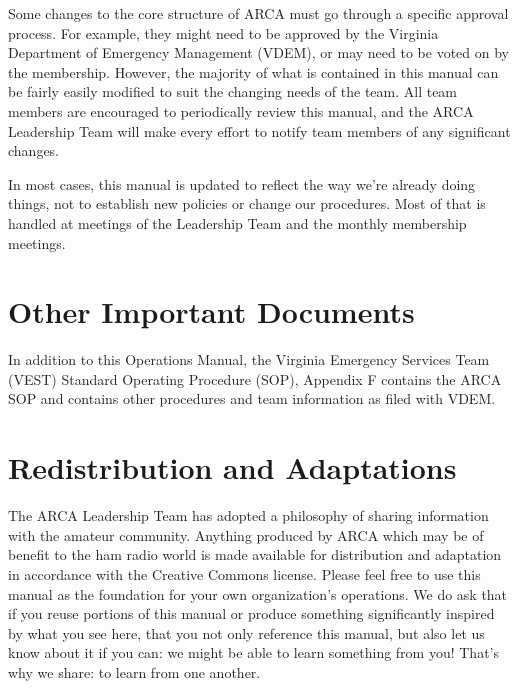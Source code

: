 \documentclass[pdflatex,letterpaper,twoside,12pt]{book}
\begin{document}
Some changes to the core structure of ARCA must go through a specific approval process.  For example, they might need to be approved by the Virginia Department of Emergency Management (VDEM), or may need to be voted on by the membership.  However, the majority of what is contained in this manual can be fairly easily modified to suit the changing needs of the team.  All team members are encouraged to periodically review this manual, and the ARCA Leadership Team will make every effort to notify team members of any significant changes.

In most cases, this manual is updated to reflect the way we're already doing things, not to establish new policies or change our procedures.  Most of that is handled at meetings of the Leadership Team and the monthly membership meetings.


\section{Other Important Documents}

In addition to this Operations Manual, the Virginia Emergency Services Team (VEST) Standard Operating Procedure (SOP), Appendix F contains the ARCA SOP and contains other procedures and team information as filed with VDEM.



\section{Redistribution and Adaptations}

The ARCA Leadership Team has adopted a philosophy of sharing information with the amateur community.  Anything produced by ARCA which may be of benefit to the ham radio world is made available for distribution and adaptation in accordance with the Creative Commons license.  Please feel free to use this manual as the foundation for your own organization's operations.  We do ask that if you reuse portions of this manual or produce something significantly inspired by what you see here, that you not only reference this manual, but also let us know about it if you can:  we might be able to learn something from you!  That's why we share:  to learn from one another.
\end{document}
